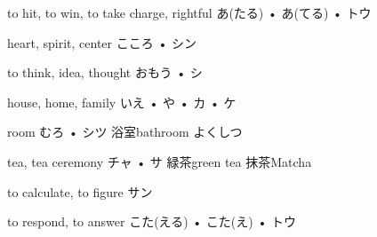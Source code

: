



\setcounter{cardnum}{33}

		{to hit, to win, to take charge, rightful}
		{あ(たる) • あ(てる) • トウ}
		{}{}
		{}{}
		{}{}
		{}{}
		{}{}

		{heart, spirit, center}
		{こころ • シン}
		{}{}
		{}{}
		{}{}
		{}{}
		{}{}

		{to think, idea, thought}
		{おもう • シ}
		{}{}
		{}{}
		{}{}
		{}{}
		{}{}

		{house, home, family}
		{いえ • や • カ • ケ}
		{}{}
		{}{}
		{}{}
		{}{}
		{}{}

		{room}
		{むろ • シツ}
		{浴室}{bathroom よくしつ}
		{}{}
		{}{}
		{}{}
		{}{}

		{tea, tea ceremony}
		{チャ • サ}
		{緑茶}{green tea }
		{抹茶}{Matcha }
		{}{}
		{}{}
		{}{}

		{to calculate, to figure}
		{サン}
		{}{}
		{}{}
		{}{}
		{}{}
		{}{}

		{to respond, to answer}
		{こた(える) • こた(え) • トウ}
		{}{}
		{}{}
		{}{}
		{}{}
		{}{}

